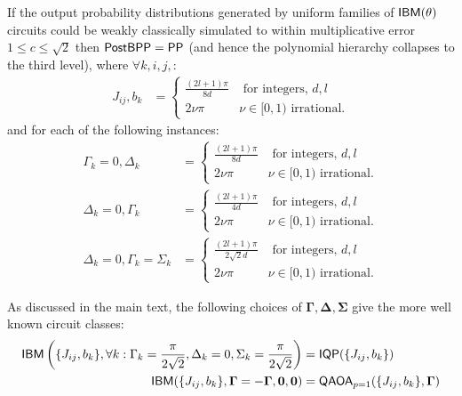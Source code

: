 \begin{theorem}\label{thm:ibmmultsimulationhardness}
    If the output probability distributions generated by uniform families of $\textsf{IBM}(\theta)$ circuits could be weakly classically simulated to within multiplicative error $1 \leq c \leq \sqrt{2}$ then $\operatorname{\textsf{PostBPP}} = \operatorname{\textsf{PP}}$ (and hence the polynomial hierarchy collapses to the third level), where $\forall k, i, j,$:
    \begin{align}
        J_{ij}, b_{k} &= 
        \begin{cases}
            \frac{(2l+1)\pi}{8d} &\text{ for integers, } d, l\\
            2\nu \pi& \nu \in[0,1) \text{ irrational.}
        \end{cases}\label{hardparametervalues1}
    \end{align}
    and for each of the following instances:
    \begin{align}
        \Gamma_k = 0, \Delta_k &=  
        \begin{cases}
            \frac{(2l+1)\pi}{8d} &\text{ for integers, } d, l\\
            2\nu \pi& \nu \in[0,1) \text{ irrational.}
        \end{cases}\label{hardparametervalues2}\\
        \Delta_k = 0, \Gamma_k &= 
        \begin{cases}
            \frac{(2l+1)\pi}{4d} &\text{ for integers, } d, l\\
            2\nu \pi& \nu \in[0,1) \text{ irrational.}
        \end{cases}\label{hardparametervalues3}\\
        \Delta_k = 0, \Gamma_k = \Sigma_k &=  
        \begin{cases}
            \frac{(2l+1)\pi}{2\sqrt{2}d} &\text{ for integers, } d, l\\
            2\nu \pi& \nu \in[0,1) \text{ irrational.}
        \end{cases}\label{hardparametervalues4}
\end{align}
\end{theorem}

As discussed in the main text, the following choices of $\mathbf{\Gamma}, \mathbf{\Delta}, \mathbf{\Sigma}$ give the more well known circuit classes:
\begin{align}
    \textsf{IBM}\left(\{J_{ij}, b_{k}\}, \forall k: \Gamma_k = \frac{\pi}{2\sqrt{2}}, \Delta_k = 0, \Sigma_k =  \frac{\pi}{2\sqrt{2}}\right) &= \operatorname{\textsf{IQP}}(\{J_{ij}, b_{k}\})\\
    \textsf{IBM}(\{J_{ij}, b_{k}\}, \mathbf{\Gamma} = -\mathbf{\Gamma}, \mathbf{0} , \mathbf{0}) &= \operatorname{\textsf{QAOA}}_{p=1}(\{J_{ij}, b_{k}\}, \mathbf{\Gamma})
\end{align}

